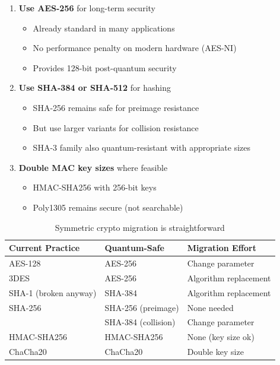 \documentclass[11pt,a4paper]{article}
\begin{document}
\begin{enumerate}
    \item \textbf{Use AES-256} for long-term security
    \begin{itemize}
        \item Already standard in many applications
        \item No performance penalty on modern hardware (AES-NI)
        \item Provides 128-bit post-quantum security
    \end{itemize}
    
    \item \textbf{Use SHA-384 or SHA-512} for hashing
    \begin{itemize}
        \item SHA-256 remains safe for preimage resistance
        \item But use larger variants for collision resistance
        \item SHA-3 family also quantum-resistant with appropriate sizes
    \end{itemize}
    
    \item \textbf{Double MAC key sizes} where feasible
    \begin{itemize}
        \item HMAC-SHA256 with 256-bit keys
        \item Poly1305 remains secure (not searchable)
    \end{itemize}
\end{enumerate}

\begin{table}[h]
\centering
\begin{tabular}{|l|l|l|}
\hline
\textbf{Current Practice} & \textbf{Quantum-Safe} & \textbf{Migration Effort} \\
\hline
AES-128 & AES-256 & Change parameter \\
3DES & AES-256 & Algorithm replacement \\
SHA-1 (broken anyway) & SHA-384 & Algorithm replacement \\
SHA-256 & SHA-256 (preimage) & None needed \\
& SHA-384 (collision) & Change parameter \\
HMAC-SHA256 & HMAC-SHA256 & None (key size ok) \\
ChaCha20 & ChaCha20 & Double key size \\
\hline
\end{tabular}
\caption{Symmetric crypto migration is straightforward}
\end{table}
\end{document}
